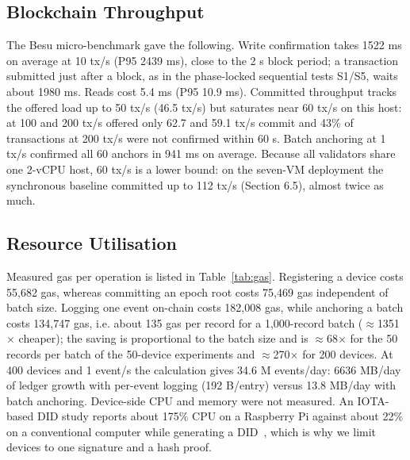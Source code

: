 \documentclass[a4paper,5p,times,twocolumn,number,sort&compress]{elsarticle}
\begin{document}
\subsection{Blockchain Throughput}

The Besu micro-benchmark gave the following. Write confirmation takes 1522 ms on average at 10 tx/s (P95 2439 ms), close to the 2 s block period; a transaction submitted just after a block, as in the phase-locked sequential tests S1/S5, waits about 1980 ms. Reads cost 5.4 ms (P95 10.9 ms). Committed throughput tracks the offered load up to 50 tx/s (46.5 tx/s) but saturates near 60 tx/s on this host: at 100 and 200 tx/s offered only 62.7 and 59.1 tx/s commit and 43\% of transactions at 200 tx/s were not confirmed within 60 s. Batch anchoring at 1 tx/s confirmed all 60 anchors in 941 ms on average. Because all validators share one 2-vCPU host, 60 tx/s is a lower bound: on the seven-VM deployment the synchronous baseline committed up to 112 tx/s (Section 6.5), almost twice as much.

\subsection{Resource Utilisation}

Measured gas per operation is listed in Table~\ref{tab:gas}. Registering a device costs 55,682 gas, whereas committing an epoch root costs 75,469 gas independent of batch size. Logging one event on-chain costs 182,008 gas, while anchoring a batch costs 134,747 gas, i.e. about 135 gas per record for a 1,000-record batch ($\approx$1351$\times$ cheaper); the saving is proportional to the batch size and is $\approx$68$\times$ for the 50 records per batch of the 50-device experiments and $\approx$270$\times$ for 200 devices. At 400 devices and 1 event/s the calculation gives 34.6 M events/day: 6636 MB/day of ledger growth with per-event logging (192 B/entry) versus 13.8 MB/day with batch anchoring. Device-side CPU and memory were not measured. An IOTA-based DID study reports about 175\% CPU on a Raspberry Pi against about 22\% on a conventional computer while generating a DID~\cite{ramirez}, which is why we limit devices to one signature and a hash proof.
\end{document}
